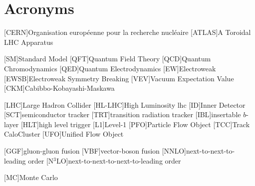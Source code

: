 
\chapter{Acronyms}
\begin{acronym}[neos]
    [CERN]{Organisation européenne pour la recherche nucléaire}
    [ATLAS]{A Toroidal LHC Apparatus}

    [SM]{Standard Model}
    [QFT]{Quantum Field Theory}
    [QCD]{Quantum Chromodynamics}
    [QED]{Quantum Electrodynamics}
    [EW]{Electroweak}
    [EWSB]{Electroweak Symmetry Breaking}
    [VEV]{Vacuum Expectation Value}
    [CKM]{Cabibbo-Kobayashi-Maskawa}

    [LHC]{Large Hadron Collider}
    [HL-LHC]{High Luminosity \acs{lhc}}
    [ID]{Inner Detector}
    [SCT]{semiconductor tracker}
    [TRT]{transition radiation tracker}
    [IBL]{insertable $b$-layer}
    [HLT]{high level trigger}
    [L1]{Level-1}
    [PFO]{Particle Flow Object}
    [TCC]{Track CaloCluster}
    [UFO]{Unified Flow Object}

    [GGF]{gluon-gluon fusion}
    [VBF]{vector-boson fusion}
    [NNLO]{next-to-next-to-leading order}
    [N$^3$LO]{next-to-next-to-next-to-leading order}


    [MC]{Monte Carlo}


\end{acronym}
